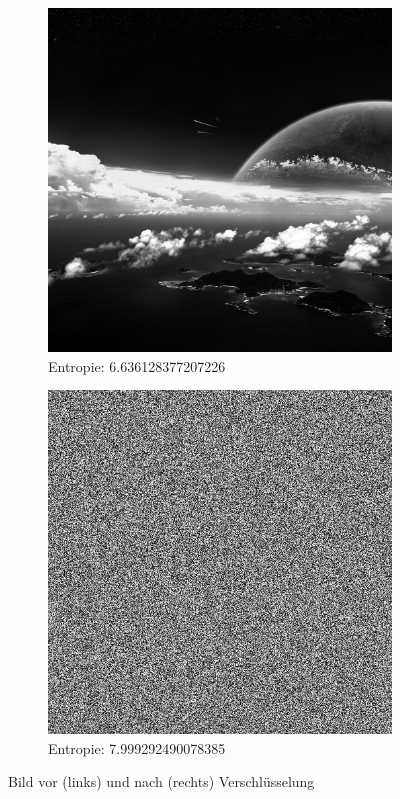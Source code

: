 \begin{figure}
	\centering

	\begin{subfigure}{0.35\textwidth}
		\includegraphics[width=\textwidth]{../1/3/gray_6.636128377207226_planet_sky.jpg}
		\caption{Entropie: 6.636128377207226}
	\end{subfigure}
	\hfill
	\begin{subfigure}{0.35\textwidth}
		\includegraphics[width=\textwidth]{../1/3/encrypted_7.9992924900783855_planet_sky.jpg}
		\caption{Entropie: 7.999292490078385}
	\end{subfigure}

	\caption{Bild vor (links) und nach (rechts) Verschlüsselung}
	\label{fig:sky}
\end{figure}





